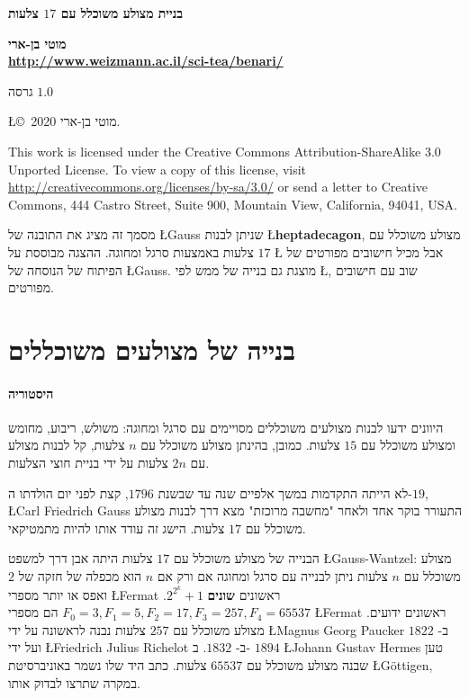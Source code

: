 \documentclass[11pt,a4paper]{article}
\begin{document}
\thispagestyle{empty}
\begin{center}
\textbf{\LARGE בניית מצולע משוכלל עם 
$17$
צלעות}

\bigskip

\textbf{\Large מוטי בן-ארי\\\bigskip\url{http://www.weizmann.ac.il/sci-tea/benari/}}
\smallskip

גרסה
$1.0$
\end{center}

\begin{footnotesize}
\begin{center}
\L{\copyright{}\  2020} מוטי בן-ארי. 
\end{center}
This work is licensed under the Creative Commons Attribution-ShareAlike 3.0 Unported License. To view a copy of this license, visit \url{http://creativecommons.org/licenses/by-sa/3.0/} or send a letter to Creative Commons, 444 Castro Street, Suite 900, Mountain View, California, 94041, USA.

\end{footnotesize}
מסמך זה מציג את התובנה של 
\L{Gauss}
שניתן לבנות 
\L{\textbf{heptadecagon}},
מצולע משוכלל עם 
$17$
צלעות באמצעות סרגל ומחוגה.
ההצגה מבוססת על
\L{\cite{jorg}}
אבל מכיל חישובים מפורטים של הפיתוח של הנוסחה של
\L{Gauss}.
מוצגת גם בנייה של ממש לפי
\L{\cite{callagy}},
שוב עם חישובים מפורטים.

\section{בנייה של מצולעים משוכללים}

\paragraph{היסטוריה}
היוונים ידעו לבנות מצולעים משוכללים מסויימים  עם סרגל ומחוגה: משולש, ריבוע, מחומש ומצולע משוכלל עם $15$ צלעות.
כמובן, בהינתן מצולע משוכלל עם
$n$
צלעות, קל לבנות מצולע עם 
$2n$
צלעות על ידי בניית חוצי הצלעות.

לא הייתה התקדמות במשך אלפיים שנה עד שבשנת
$1796$,
קצת לפני יום הולדתו ה-$19$,
\L{Carl Friedrich Gauss}
התעורר בוקר אחד ולאחר "מחשבה מרוכזת" מצא דרך לבנות מצולע משוכלל עם 
$17$
צלעות. הישג זה עודד אותו להיות מתמטיקאי.

הבנייה של מצולע משוכלל עם 
$17$
צלעות היתה אבן דרך למשפט
\L{Gauss-Wantzel}:
מצולע משוכלל עם 
$n$
צלעות ניתן לבנייה עם סרגל ומחוגה אם ורק אם 
$n$
הוא מכפלה של חזקה של
$2$
ואפס או יותר מספרי 
\L{Fermat}
ראשונים
\textbf{שונים}
$2^{2^k}+1$. 
$F_0=3, F_1=5, F_2=17, F_3=257, F_4=65537$
הם מספרי 
\L{Fermat}
ראשונים ידועים. מצולע משוכלל עם
$257$
צלעות נבנה לראשונה על ידי
\L{Magnus Georg Paucker}
ב-%
$1822$
ועל ידי
\L{Friedrich Julius Richelot}
ב-%
$1832$.
ב-%
$1894$
\L{Johann Gustav Hermes}
טען שבנה מצולע משוכלל עם
$65537$
צלעות.
כתב היד שלו נשמר באוניברסיטת 
\L{G\"{o}ttigen},
במקרה שתרצו לבדוק אותו.
\end{document}
